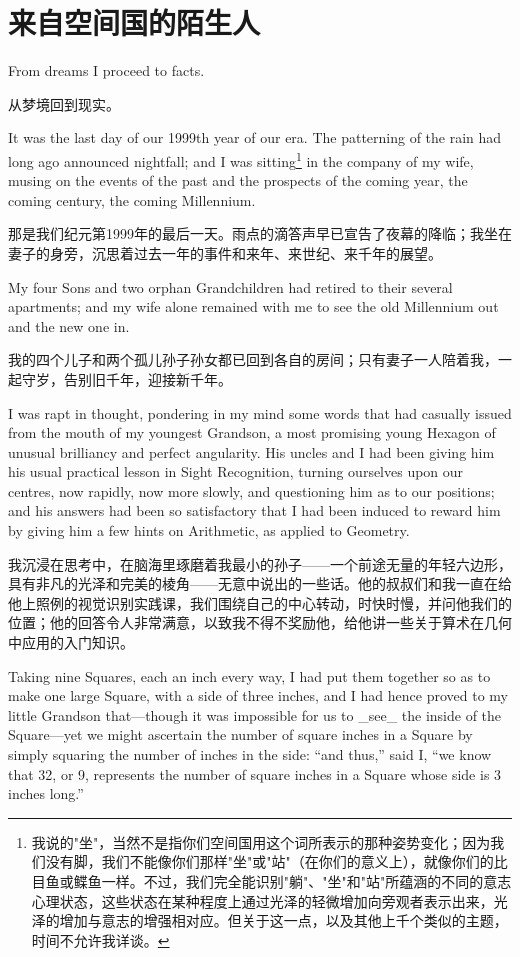 \documentclass[12pt,UTF8]{ctexbook}
\begin{document}
\chapter{来自空间国的陌生人}

From dreams I proceed to facts.

从梦境回到现实。

It was the last day of our 1999th year of our era. The patterning of the rain had long ago announced nightfall; and I was sitting\footnote{我说的"坐"，当然不是指你们空间国用这个词所表示的那种姿势变化；因为我们没有脚，我们不能像你们那样"坐"或"站"（在你们的意义上），就像你们的比目鱼或鲽鱼一样。不过，我们完全能识别"躺"、"坐"和"站"所蕴涵的不同的意志心理状态，这些状态在某种程度上通过光泽的轻微增加向旁观者表示出来，光泽的增加与意志的增强相对应。但关于这一点，以及其他上千个类似的主题，时间不允许我详谈。} in the company of my wife, musing on the events of the past and the prospects of the coming year, the coming century, the coming Millennium.

那是我们纪元第1999年的最后一天。雨点的滴答声早已宣告了夜幕的降临；我坐在妻子的身旁，沉思着过去一年的事件和来年、来世纪、来千年的展望。

My four Sons and two orphan Grandchildren had retired to their several apartments; and my wife alone remained with me to see the old Millennium out and the new one in.

我的四个儿子和两个孤儿孙子孙女都已回到各自的房间；只有妻子一人陪着我，一起守岁，告别旧千年，迎接新千年。

I was rapt in thought, pondering in my mind some words that had casually issued from the mouth of my youngest Grandson, a most promising young Hexagon of unusual brilliancy and perfect angularity. His uncles and I had been giving him his usual practical lesson in Sight Recognition, turning ourselves upon our centres, now rapidly, now more slowly, and questioning him as to our positions; and his answers had been so satisfactory that I had been induced to reward him by giving him a few hints on Arithmetic, as applied to Geometry.

我沉浸在思考中，在脑海里琢磨着我最小的孙子——一个前途无量的年轻六边形，具有非凡的光泽和完美的棱角——无意中说出的一些话。他的叔叔们和我一直在给他上照例的视觉识别实践课，我们围绕自己的中心转动，时快时慢，并问他我们的位置；他的回答令人非常满意，以致我不得不奖励他，给他讲一些关于算术在几何中应用的入门知识。

Taking nine Squares, each an inch every way, I had put them together so as to make one large Square, with a side of three inches, and I had hence proved to my little Grandson that---though it was impossible for us to \_see\_ the inside of the Square---yet we might ascertain the number of square inches in a Square by simply squaring the number of inches in the side: ``and thus,'' said I, ``we know that 32, or 9, represents the number of square inches in a Square whose side is 3 inches long.''
\end{document}
